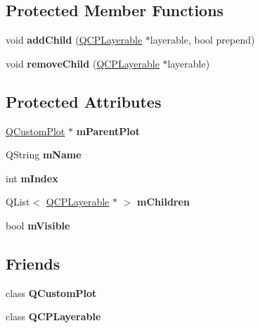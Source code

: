 \subsection*{Protected Member Functions}
\begin{DoxyCompactItemize}
\item 
\mbox{\label{class_q_c_p_layer_a57ce5e49364aa9122276d5df3b4a0ddc}} 
void {\bfseries add\+Child} (\mbox{\hyperlink{class_q_c_p_layerable}{Q\+C\+P\+Layerable}} $\ast$layerable, bool prepend)
\item 
\mbox{\label{class_q_c_p_layer_ac2f64ac7761650582d968d86670ef362}} 
void {\bfseries remove\+Child} (\mbox{\hyperlink{class_q_c_p_layerable}{Q\+C\+P\+Layerable}} $\ast$layerable)
\end{DoxyCompactItemize}
\subsection*{Protected Attributes}
\begin{DoxyCompactItemize}
\item 
\mbox{\label{class_q_c_p_layer_a2f3374a7884bf403720cd1cf6f7ad1bb}} 
\mbox{\hyperlink{class_q_custom_plot}{Q\+Custom\+Plot}} $\ast$ {\bfseries m\+Parent\+Plot}
\item 
\mbox{\label{class_q_c_p_layer_a91e6298183cb4b9dfd4efdfaf1ecc220}} 
Q\+String {\bfseries m\+Name}
\item 
\mbox{\label{class_q_c_p_layer_a122088bcab6cec76a52b75ce8606605b}} 
int {\bfseries m\+Index}
\item 
\mbox{\label{class_q_c_p_layer_a704aa71bba469383c3a3c598c1ec0d28}} 
Q\+List$<$ \mbox{\hyperlink{class_q_c_p_layerable}{Q\+C\+P\+Layerable}} $\ast$ $>$ {\bfseries m\+Children}
\item 
\mbox{\label{class_q_c_p_layer_a264950deb08e589460c126c895a1e2b5}} 
bool {\bfseries m\+Visible}
\end{DoxyCompactItemize}
\subsection*{Friends}
\begin{DoxyCompactItemize}
\item 
\mbox{\label{class_q_c_p_layer_a1cdf9df76adcfae45261690aa0ca2198}} 
class {\bfseries Q\+Custom\+Plot}
\item 
\mbox{\label{class_q_c_p_layer_ad655f55cccf49ba14d5172ec517e07ae}} 
class {\bfseries Q\+C\+P\+Layerable}
\end{DoxyCompactItemize}


